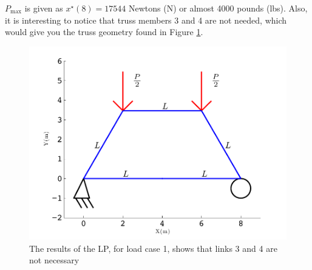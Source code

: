 \documentclass[12pt]{article}
\begin{document}
$P_\textrm{max}$ is given as $x^\star(8)=17544$ Newtons (N) or almost 4000 pounds (lbs).  Also, it is interesting to notice that truss members 3 and 4 are not needed, which would give you the truss geometry found in Figure \ref{fig:Result}.
\begin{figure}[htb!]
	\begin{center}
		\includegraphics[width=1\textwidth]{TrussFS3}
	\end{center}
	\caption{The results of the LP, for load case 1, shows that links 3 and 4 are not necessary}
	\label{fig:Result}
\end{figure}

\newpage
\end{document}
